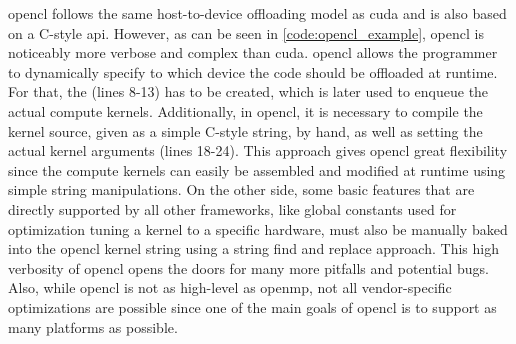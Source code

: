 \gls{opencl} follows the same host-to-device offloading model as \gls{cuda} and is also based on a C-style \gls{api}. 
However, as can be seen in \autoref{code:opencl_example}, \gls{opencl} is noticeably more verbose and complex than \gls{cuda}. 
\gls{opencl} allows the programmer to dynamically specify to which device the code should be offloaded at runtime. 
For that, the  (lines 8-13) has to be created, which is later used to enqueue the actual compute kernels. 
Additionally, in \gls{opencl}, it is necessary to compile the kernel source, given as a simple C-style string, by hand, as well as setting the actual kernel arguments (lines 18-24). 
This approach gives \gls{opencl} great flexibility since the compute kernels can easily be assembled and modified at runtime using simple string manipulations. 
On the other side, some basic features that are directly supported by all other frameworks, like global constants used for optimization tuning a kernel to a specific hardware, must also be manually baked into the \gls{opencl} kernel string using a string find and replace approach. 
This high verbosity of \gls{opencl} opens the doors for many more pitfalls and potential bugs. 
Also, while \gls{opencl} is not as high-level as \gls{openmp}, not all vendor-specific optimizations are possible since one of the main goals of \gls{opencl} is to support as many platforms as possible. 

